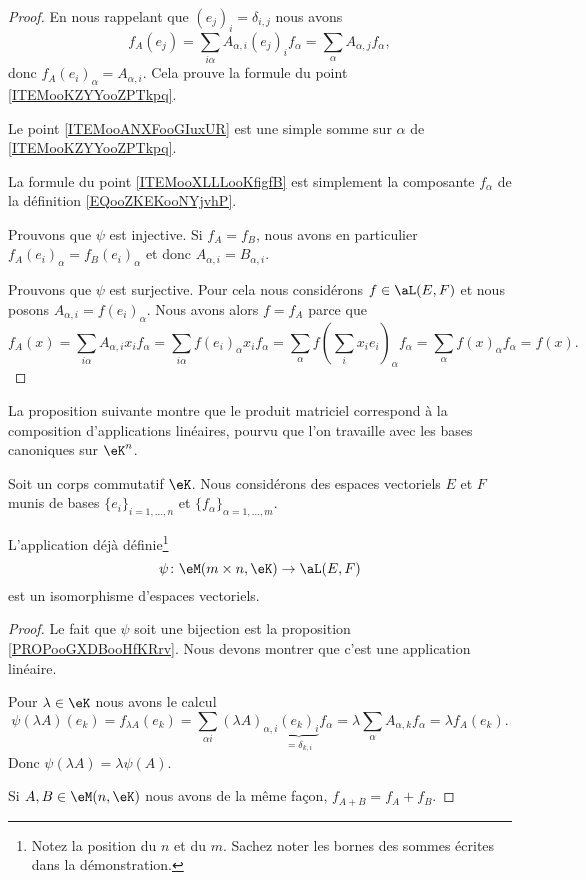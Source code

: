 \begin{proof}
	En nous rappelant que \( (e_j)_i=\delta_{i,j}\) nous avons
	\begin{equation}        \label{EQooWGZHooIBoygB}
		f_A(e_j)=\sum_{i\alpha}A_{\alpha, i}(e_j)_if_{\alpha}=\sum_{\alpha}A_{\alpha, j}f_{\alpha},
	\end{equation}
	donc \( f_A(e_i)_{\alpha}=A_{\alpha, i}\). Cela prouve la formule du point \ref{ITEMooKZYYooZPTkpq}.

	Le point \ref{ITEMooANXFooGIuxUR} est une simple somme sur \( \alpha\) de \ref{ITEMooKZYYooZPTkpq}.

	La formule du point \ref{ITEMooXLLLooKfigfB} est simplement la composante \( f_{\alpha}\) de la définition \ref{EQooZKEKooNYjvhP}.

	Prouvons que \( \psi\) est injective. Si \( f_A=f_B\), nous avons en particulier \( f_A(e_i)_{\alpha}=f_B(e_i)_{\alpha}\) et donc \( A_{\alpha, i}=B_{\alpha, i}\).

	Prouvons que \( \psi\) est surjective. Pour cela nous considérons \( f\in \aL(E,F)\) et nous posons \( A_{\alpha, i}=f(e_i)_{\alpha}\). Nous avons alors \( f=f_A\) parce que
	\begin{equation}
		f_A(x)=\sum_{i\alpha}A_{\alpha, i}x_if_{\alpha}=\sum_{i\alpha}f(e_i)_{\alpha}x_if_{\alpha}=\sum_{\alpha}f(\sum_ix_ie_i)_{\alpha}f_{\alpha}=\sum_{\alpha}f(x)_{\alpha}f_{\alpha}=f(x).
	\end{equation}
\end{proof}

La proposition suivante montre que le produit matriciel correspond à la composition d'applications linéaires, pourvu que l'on travaille avec les bases canoniques sur \( \eK^n\).
\begin{proposition}      \label{PROPooIYVQooOiuRhX}
	Soit un corps commutatif \( \eK\). Nous considérons des espaces vectoriels \( E\) et \( F\) munis de bases \( \{ e_i \}_{i=1,\ldots, n}\) et \( \{ f_{\alpha}\}_{\alpha=1,\ldots, m} \).

	L'application déjà définie\footnote{Notez la position du \( n\) et du \( m\). Sachez noter les bornes des sommes écrites dans la démonstration.}
	\begin{equation}
		\psi\colon \eM(m\times n,\eK)\to \aL(E,F)
	\end{equation}
	est un isomorphisme d'espaces vectoriels.
\end{proposition}

\begin{proof}
	Le fait que \( \psi\) soit une bijection est la proposition \ref{PROPooGXDBooHfKRrv}. Nous devons montrer que c'est une application linéaire.

	Pour \( \lambda\in \eK\) nous avons le calcul
	\begin{equation}
		\psi(\lambda A)(e_k)=f_{\lambda A}(e_k)=\sum_{\alpha i}(\lambda A)_{\alpha, i}\underbrace{(e_k)_i}_{=\delta_{k,i}}f_{\alpha}=\lambda\sum_{\alpha}A_{\alpha, k}f_{\alpha}=\lambda f_A(e_k).
	\end{equation}
	Donc \( \psi(\lambda A)=\lambda\psi(A)\).

	Si \( A,B\in \eM(n,\eK)\) nous avons de la même façon, \( f_{A+B}=f_A+f_B\).
\end{proof}

